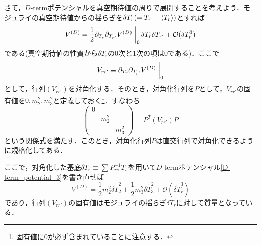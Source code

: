\documentclass[a4paper,uplatex,dvipdfmx]{jsarticle}
\theoremstyle{definition}
\begin{document}
さて，$D$-termポテンシャルを真空期待値の周りで展開することを考えよう．モジュライの真空期待値からの揺らぎを$\delta T_{r}(=T_{r}-\ev*{T_{r}})$とすれば
\begin{equation}
   V^{(D)}
   =
   \frac{1}{2}
   \partial_{T_{r}}\partial_{T_{r'}}V^{(D)}
   \left.\vphantom{\frac{1}{2}}\right|_{0}
   \delta T_{r}\delta T_{r'}
   +
   \mathcal{O}(\delta T_{r}^{3})
   \label{D-term_potential_3}
\end{equation}
である(真空期待値の性質から$\delta T_{r}$の0次と1次の項は0である)．ここで
\begin{equation}
   V_{rr'}
   \equiv
   \partial_{T_{r}}\partial_{T_{r'}}V^{(D)}
   \left.\vphantom{\frac{1}{2}}\right|_{0}
   \nonumber
\end{equation}
として，行列$(V_{rr'})$を対角化する．そのとき，対角化行列を$P$として，$V_{rr'}$の固有値を$0,m_{2}^{2},m_{3}^{2}$と定義しておく\footnote{
   固有値に0が必ず含まれていることに注意する．
}．すなわち
\begin{equation}
   \begin{pmatrix}
      0 &  & \\
      & m_{2}^2 & \\
      & & m_{3}^{2}
   \end{pmatrix}
   =
   P^{T}
   (V_{rr'})
   P
   \label{eigencal_V}
\end{equation}
という関係式を満たす．このとき，対角化行列$P$は直交行列で対角化できるように規格化してある．

ここで，対角化した基底$\delta \tilde{T}_{r}\equiv\sum P^{-1}_{rs}T_{s}$を用いて$D$-termポテンシャル\eqref{D-term_potential_3}を書き直せば
\begin{equation}
   V^{(D)}
   =
   \frac{1}{2}m_{2}^{2}\delta \tilde{T}_{2}^{2}
   +
   \frac{1}{2}m_{3}^{2}\delta \tilde{T}_{3}^{2}
   +
   \mathcal{O}(\delta \tilde{T}_{r}^{3})
   \nonumber
\end{equation}
であり，行列$(V_{rr'})$の固有値はモジュライの揺らぎ$\delta T_{r}$に対して質量となっている．
\end{document}
